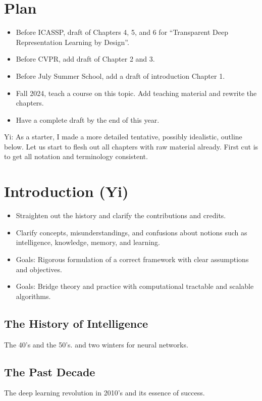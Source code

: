 \documentclass{article}
\begin{document}
\section*{Plan}
\begin{itemize}
    \item Before ICASSP, draft of Chapters 4, 5, and 6 for ``Transparent Deep Representation Learning by Design''.
    \item Before CVPR, add draft of Chapter 2 and 3. 
    \item Before July Summer School, add a draft of introduction Chapter 1.
    \item Fall 2024, teach a course on this topic. Add teaching material and rewrite the chapters.
    \item Have a complete draft by the end of this year.
\end{itemize}


{\color{red} Yi: As a starter, I made a more detailed tentative, possibly idealistic, outline below. Let us start to flesh out all chapters with raw material already. First cut is to get all notation and terminology consistent.}
\newpage
\section{Introduction (Yi)}
\begin{itemize}
\item Straighten out the history and clarify the contributions and credits. 
\item Clarify concepts,  misunderstandings, and  confusions about notions such as intelligence, knowledge, memory, and learning.
\item Goals: Rigorous formulation of a correct framework with clear assumptions and objectives. 
\item Goals: Bridge theory and practice with computational tractable and scalable algorithms. 
\end{itemize}

\subsection{The History of Intelligence}
The 40's and the 50's. and two winters for neural networks.

\subsection{The Past Decade}
The deep learning revolution in 2010's and its essence of success.
\end{document}
